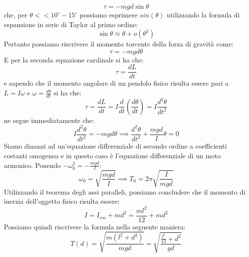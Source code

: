 \documentclass{article}
\begin{document}
\begin{equation*}
	\tau = -mgd\sin{\theta}
\end{equation*}
che, per $\theta << 10^\circ - 15^\circ$ possiamo esprimere $sin(\theta)$ utilizzando la formula di espansione in serie di Taylor al primo ordine:
\begin{equation*}
	\sin{\theta} \approx \theta + o(\theta^3)
\end{equation*}
Pertanto possiamo riscrivere il momento torcente della forza di gravità come:
\begin{equation*}
	\tau = -mgd\theta
\end{equation*}
E per la seconda equazione cardinale si ha che:
$$
	\tau = \frac{dL}{dt}
$$
e sapendo che il momento angolare di un pendolo fisico risulta essere pari a $L = I\omega$ e $\omega = \frac{d\theta}{dt}$ si ha che:
$$
	\tau = \frac{dL}{dt} = I\frac{d}{dt} \left(\frac{d\theta}{dt} \right) = I\frac{d^2 \theta}{dt^2}
$$
ne segue immediatamente che:
$$
	I\frac{d^2 \theta}{dt^2} = -mgd\theta \implies \frac{d^2 \theta}{dt^2} + \frac{mgd}{I}\theta = 0 
$$
Siamo dinanzi ad un'equazione differenziale di secondo ordine a coefficienti costanti omogenea e in questo caso è l'equazione differenziale di un moto armonico. Ponendo $-\omega_0^2 = -\frac{mgd}{I}$: 
$$\omega_0 = \sqrt{\frac{mgd}{I}} \implies T_0 = 2\pi\sqrt{\frac{I}{mgd}}$$
Utilizzando il teorema degli assi paralleli, possiamo concludere che il momento di inerzia dell'oggetto fisico risulta essere:
$$
	I = I_{cm} + md^2 = \frac{ml^2}{12} + md^2
$$
Possiamo quindi riscrivere la formula nella seguente maniera:
$$
	T(d) = \sqrt{\frac{m(l^2 + d^2)}{mgd}} = \sqrt{\frac{\frac{l^2}{12} + d^2}{gd}}
$$
\end{document}
